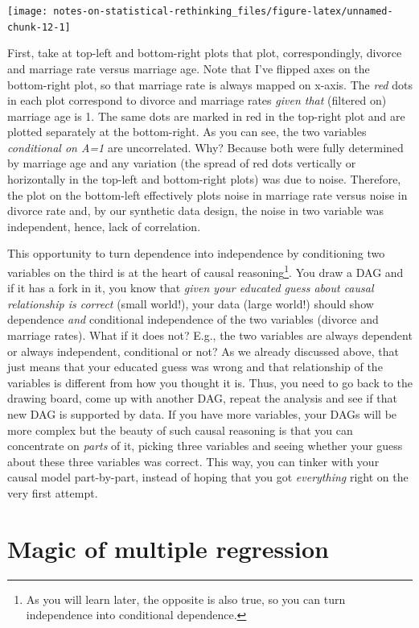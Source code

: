 \documentclass[
]{book}
\begin{document}
\begin{center}\texttt{[image: notes-on-statistical-rethinking\_files/figure-latex/unnamed-chunk-12-1]} \end{center}

First, take at top-left and bottom-right plots that plot, correspondingly, divorce and marriage rate versus marriage age. Note that I've flipped axes on the bottom-right plot, so that marriage rate is always mapped on x-axis. The \emph{red} dots in each plot correspond to divorce and marriage rates \emph{given that} (filtered on) marriage age is 1. The same dots are marked in red in the top-right plot and are plotted separately at the bottom-right. As you can see, the two variables \emph{conditional on A=1} are uncorrelated. Why? Because both were fully determined by marriage age and any variation (the spread of red dots vertically or horizontally in the top-left and bottom-right plots) was due to noise. Therefore, the plot on the bottom-left effectively plots noise in marriage rate versus noise in divorce rate and, by our synthetic data design, the noise in two variable was independent, hence, lack of correlation.

This opportunity to turn dependence into independence by conditioning two variables on the third is at the heart of causal reasoning\footnote{As you will learn later, the opposite is also true, so you can turn independence into conditional dependence.}. You draw a DAG and if it has a fork in it, you know that \emph{given your educated guess about causal relationship is correct} (small world!), your data (large world!) should show dependence \emph{and} conditional independence of the two variables (divorce and marriage rates). What if it does not? E.g., the two variables are always dependent or always independent, conditional or not? As we already discussed above, that just means that your educated guess was wrong and that relationship of the variables is different from how you thought it is. Thus, you need to go back to the drawing board, come up with another DAG, repeat the analysis and see if that new DAG is supported by data. If you have more variables, your DAGs will be more complex but the beauty of such causal reasoning is that you can concentrate on \emph{parts} of it, picking three variables and seeing whether your guess about these three variables was correct. This way, you can tinker with your causal model part-by-part, instead of hoping that you got \emph{everything} right on the very first attempt.

\hypertarget{magic-of-multiple-regression}{%
\section{Magic of multiple regression}\label{magic-of-multiple-regression}}
\end{document}
